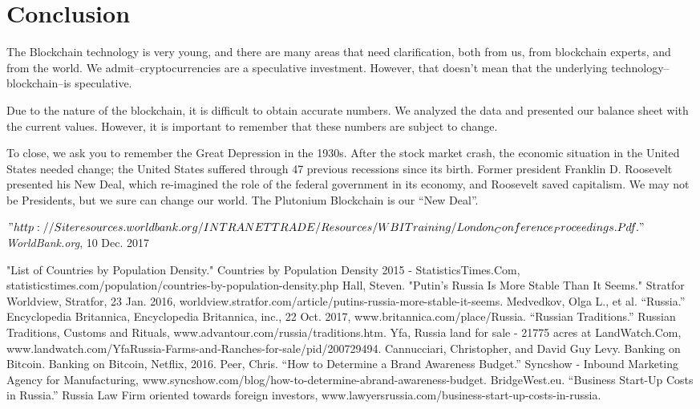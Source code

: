 \documentclass[12pt]{article}
\begin{document}
\section{Conclusion}
The Blockchain technology is very young, and there are many areas that need clarification, both from us, from blockchain experts, and from the world. We admit--cryptocurrencies are a speculative investment. However, that doesn't mean that the underlying technology--blockchain--is speculative.

Due to the nature of the blockchain, it is difficult to obtain accurate numbers. We analyzed the data and presented our balance sheet with the current values. However, it is important to remember that these numbers are subject to change.

To close, we ask you to remember the Great Depression in the 1930s. After the stock market crash, the economic situation in the United States needed change; the United States suffered through 47 previous recessions since its birth. Former president Franklin D. Roosevelt presented his New Deal, which re-imagined the role of the federal government in its economy, and Roosevelt saved capitalism. We may not be Presidents, but we sure can change our world. The Plutonium Blockchain is our ``New Deal''.
\pagebreak
\begin{thebibliography}{10}
\tiny $"http://Siteresources.worldbank.org/INTRANETTRADE/Resources/WBITraining/London_Conference_Proceedings.Pdf."$ \normalsize \textit{WorldBank.org}, 10 Dec. 2017
 
 "List of Countries by Population Density." Countries by Population Density 2015 -
StatisticsTimes.Com, \tiny statisticstimes.com/population/countries-by-population-density.php
 \normalsize
{} 
Hall, Steven. "Putin's Russia Is More Stable Than It Seems." Stratfor Worldview, Stratfor,
23 Jan. 2016, \tiny worldview.stratfor.com/article/putins-russia-more-stable-it-seems.
\normalsize
{}
Medvedkov, Olga L., et al. ``Russia.'' Encyclopedia Britannica, Encyclopedia Britannica,
inc., 22 Oct. 2017, \tiny www.britannica.com/place/Russia.
\normalsize
{}
``Russian Traditions.'' Russian Traditions, Customs and Rituals,
\tiny www.advantour.com/russia/traditions.htm.
\normalsize
{}
Yfa, Russia land for sale - 21775 acres at LandWatch.Com, \tiny www.landwatch.com/YfaRussia-Farms-and-Ranches-for-sale/pid/200729494.
\normalsize
{}
Cannucciari, Christopher, and David Guy Levy. Banking on Bitcoin. Banking on Bitcoin,
Netflix, 2016.
Peer, Chris. “How to Determine a Brand Awareness Budget.” Syncshow - Inbound
Marketing Agency for Manufacturing, \tiny www.syncshow.com/blog/how-to-determine-abrand-awareness-budget.
\normalsize
{}
BridgeWest.eu. “Business Start-Up Costs in Russia.” Russia Law Firm oriented towards
foreign investors, \tiny www.lawyersrussia.com/business-start-up-costs-in-russia.
\end{thebibliography}
\end{document}
